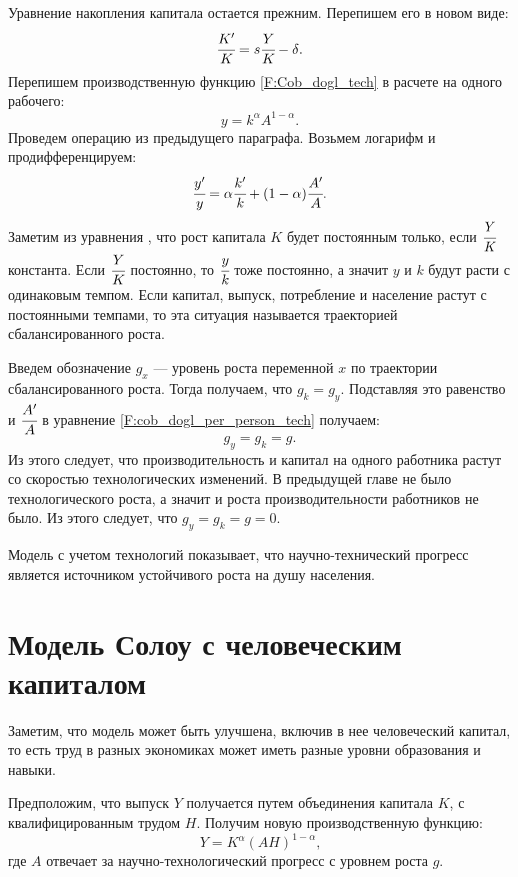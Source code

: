 Уравнение накопления капитала остается прежним. Перепишем его в новом виде:
\begin{equation}
\cfrac{K'}{K} = s \cfrac{Y}{K} - \delta\text{.}
\label{F:capital_solow_tech}
\end{equation}
Перепишем производственную функцию \ref{F:Cob_dogl_tech} в расчете на одного рабочего:
\begin{equation*}
y=k^{\alpha}A^{1 - \alpha}\text{.}
\end{equation*}
Проведем операцию из предыдущего параграфа.
Возьмем логарифм и продифференцируем:
\begin{equation}
\cfrac{y'}{y} = \alpha \cfrac{k'}{k} + (1 - \alpha) \cfrac{A'}{A}\text{.}
\label{F:cob_dogl_per_person_tech}
\end{equation}
Заметим из уравнения \label{F:capital_solow_tech}, что рост капитала $K$ будет постоянным только, если $\cfrac{Y}{K}$ константа.
Если $\cfrac{Y}{K}$ постоянно, то $\cfrac{y}{k}$ тоже постоянно, а значит $y$ и $k$ будут расти с одинаковым темпом.
Если капитал, выпуск, потребление и население растут с постоянными темпами, то эта ситуация называется траекторией сбалансированного роста.

Введем обозначение $g_{x}$ --- уровень роста переменной $x$ по траектории сбалансированного роста.
Тогда получаем, что $g_{k} = g_{y}$. Подставляя это равенство и $\cfrac{A'}{A}$ в уравнение \ref{F:cob_dogl_per_person_tech} получаем:
\begin{equation*}
g_{y} = g_{k}=g\text{.}
\end{equation*}
Из этого следует, что производительность и капитал на одного работника растут со скоростью технологических изменений.
В предыдущей главе не было технологического роста, а значит и роста производительности работников не было.
Из этого следует, что $g_{y}=g_{k}=g=0$.

Модель с учетом технологий показывает, что научно-технический прогресс является источником устойчивого роста на душу населения.

\section{Модель Солоу с человеческим капиталом}

Заметим, что модель может быть улучшена, включив в нее человеческий капитал, то есть труд в разных экономиках может иметь разные уровни образования и навыки.

Предположим, что выпуск $Y$ получается путем объединения капитала $K$, с квалифицированным трудом $H$.
Получим новую производственную функцию:
\begin{equation}
Y=K^{\alpha}(AH)^{1-\alpha}\text{,}
\end{equation}
где $A$ отвечает за научно-технологический прогресс с уровнем роста $g$.

